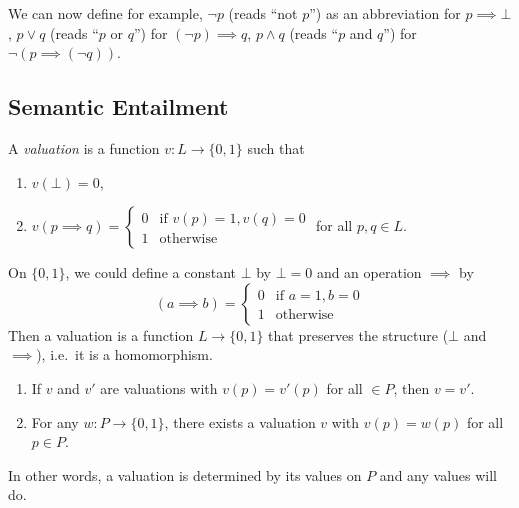 \documentclass[a4paper]{article}
\begin{document}
We can now define for example, \(\neg p\) (reads ``not \(p\)'') as an abbreviation for \(p \implies \bot\), \(p \lor q\) (reads ``\(p\) or \(q\)'') for \((\neg p) \implies q\), \(p \land q\) (reads ``\(p\) and \(q\)'') for \(\neg (p \implies (\neg q))\).

\subsection{Semantic Entailment}

\begin{definition}[Valuation]
  A \emph{valuation} is a function \(v: L \to \{0, 1\}\) such that
  \begin{enumerate}
  \item \(v(\bot) = 0\),
  \item \(v(p \implies q) = \begin{cases} 0 & \text{if } v(p) = 1, v(q) = 0 \\ 1 & \text{otherwise} \end{cases}\) for all \(p, q \in L\).
  \end{enumerate}
\end{definition}

\begin{remark}
  On \(\{0, 1\}\), we could define a constant \(\bot\) by \(\bot = 0\) and an operation \(\implies\) by
  \[
    (a \implies b) =
    \begin{cases}
      0 & \text{if } a = 1, b = 0 \\
      1 & \text{otherwise}
    \end{cases}
  \]
  Then a valuation is a function \(L \to \{0, 1\}\) that preserves the structure (\(\bot\) and \(\implies\)), i.e.\ it is a homomorphism.
\end{remark}

\begin{proposition}\leavevmode
  \begin{enumerate}
  \item If \(v\) and \(v'\) are valuations with \(v(p) = v'(p)\) for all \( \in P\), then \(v = v'\).
  \item For any \(w: P \to \{0, 1\}\), there exists a valuation \(v\) with \(v(p) = w(p)\) for all \(p \in P\).
  \end{enumerate}
\end{proposition}

In other words, a valuation is determined by its values on \(P\) and any values will do.
\end{document}
